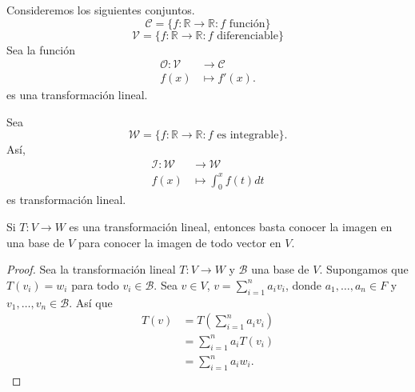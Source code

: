 \documentclass[12pt,a4paper]{book}
\newcommand{\llaves}[1]{\{#1\}}
\newcommand{\parentesis}[1]{\left(#1\right)}
\begin{document}
    \begin{ejemplo}
    \label{ej:21}
        Consideremos los siguientes conjuntos.
        \begin{equation*}
            \mathcal{C} = \llaves{f:\mathbb{R} \to \mathbb{R}: f \text{ función}}
        \end{equation*}
        \begin{equation*}
            \mathcal{V} = \llaves{f: \mathbb{R} \to \mathbb{R}:f \text{ diferenciable}}
        \end{equation*}
        Sea la función
        \begin{align*}
            \mathcal{O}:\mathcal{V} & \to \mathcal{C}\\
            f(x) & \mapsto f'(x).
        \end{align*}
        es una transformación lineal.
    \end{ejemplo}

    \begin{ejemplo}
    \label{ej:22}
        Sea
        \begin{equation*}
            \mathcal{W} = \llaves{f:\mathbb{R} \to \mathbb{R}:f \text{ es integrable}}.
        \end{equation*}
        Así,
        \begin{align*}
            \mathcal{I}: \mathcal{W} & \to \mathcal{W}\\
            f(x) & \mapsto \int_{0}^{x}f(t)dt
        \end{align*}
        es transformación lineal.
    \end{ejemplo}

    \begin{proposicion}
    \label{prop:25}
        Si $T:V \to W$ es una transformación lineal, entonces basta conocer la imagen en una base
        de $V$ para conocer la imagen de todo vector en $V$.
    \end{proposicion}

    \begin{proof}
        Sea la transformación lineal $T:V \to W$ y $\mathcal{B}$ una base de $V$. Supongamos que $T(v_{i}) = w_{i}$ para todo $v_{i} \in \mathcal{B}$. Sea $v \in V$, $v = \sum_{i = 1}^{n}a_{i}v_{i}$, donde $a_{1}, \dots, a_{n} \in F$ y $v_{1}, \dots, v_{n} \in \mathcal{B}$. Así que
        \begin{align*}
            T(v) & = T\parentesis{\sum_{i = 1}^{n}a_{i}v_{i}}\\
            & = \sum_{i = 1}^{n}a_{i}T(v_{i})\\
            & = \sum_{i = 1}^{n}a_{i}w_{i}.
        \end{align*}
    \end{proof}
\end{document}

